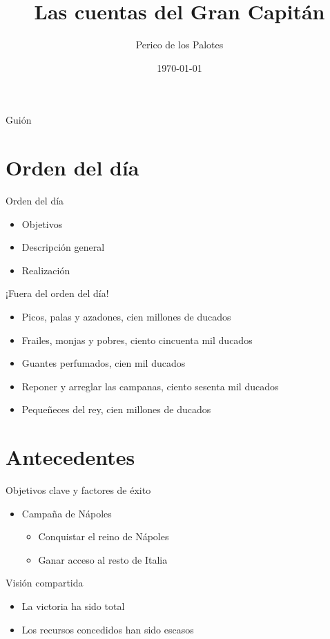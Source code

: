 \documentclass{beamer}
\title{Las cuentas del Gran Capitán}
\author{Perico de los Palotes}
\institute{Reino de Castilla y León}
\date{\today}
\begin{document}
\begin{frame}
  \titlepage
\end{frame}

\begin{frame}{Guión}
  \tableofcontents
\end{frame}

\section{Orden del día}

\begin{frame}{Orden del día}

\begin{itemize}
  \item Objetivos
  \item Descripción general
  \item Realización
\end{itemize}

\end{frame}

\begin{frame}{¡Fuera del orden del día!}

\begin{itemize}[<+->]
  \item Picos, palas y azadones, cien millones de ducados
  \item Frailes, monjas y pobres, ciento cincuenta mil ducados
  \item Guantes perfumados, cien mil ducados
  \item Reponer y arreglar las campanas, ciento sesenta mil ducados
  \item Pequeñeces del rey, cien millones de ducados 
\end{itemize}

\end{frame}

\section{Antecedentes}

\begin{frame} {Objetivos clave y  factores de éxito}

\begin{itemize}
\item Campaña de Nápoles
  \begin{itemize}
    \item Conquistar el reino de Nápoles
    \item Ganar acceso al resto de Italia
  \end{itemize}
\end{itemize}

\begin{block}{Visión compartida}
\begin{itemize}
\item La victoria ha sido total
\item Los  recursos concedidos han sido escasos
\end{itemize}
\end{block}

\end{frame}
\end{document}
